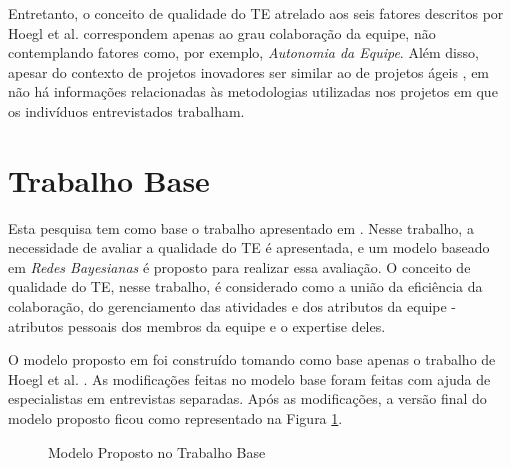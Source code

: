 Entretanto, o conceito de qualidade do TE atrelado aos seis fatores descritos por Hoegl et al. \cite{hoegl} correspondem apenas ao grau colaboração da equipe, não contemplando fatores como, por exemplo, \textit{Autonomia da Equipe}. Além disso, apesar do contexto de projetos inovadores ser similar ao de projetos ágeis \cite{freire}, em \cite{hoegl} não há informações relacionadas às metodologias utilizadas nos projetos em que os indivíduos entrevistados trabalham.

\section{Trabalho Base}
\label{trabalhos:base}

Esta pesquisa tem como base o trabalho apresentado em \cite{freire}. Nesse trabalho, a necessidade de avaliar a qualidade do TE é apresentada, e um modelo baseado em \textit{Redes Bayesianas} é proposto para realizar essa avaliação. O conceito de qualidade do TE, nesse trabalho, é considerado como a união da eficiência da colaboração, do gerenciamento das atividades e dos atributos da equipe - atributos pessoais dos membros da equipe e o expertise deles.

O modelo proposto em \cite{freire} foi construído tomando como base apenas o trabalho de Hoegl et al. \cite{hoegl}. As modificações feitas no modelo base foram feitas com ajuda de especialistas em entrevistas separadas. Após as modificações, a versão final do modelo proposto ficou como representado na Figura \ref{trabalho:base:modelo}.

\begin{figure}[ht!]
\begin{center}
    \end{center}
    \caption{Modelo Proposto no Trabalho Base}
    \label{trabalho:base:modelo}
\end{figure}

